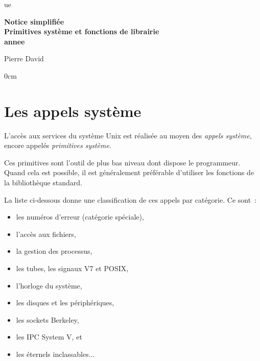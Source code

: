 \documentclass [twoside] {report}
\newcommand {\tassertoc} {{ \setlength {\parskip} {0cm} \tableofcontents }}
\begin{document}
\thispagestyle {empty}

\begin {titlepage}
     {ue}

    \vfill

    \begin {center}
	\huge\bf
	Notice simplifiée \\
	\vspace* {5mm}
	Primitives système et fonctions de librairie \\
	\vspace* {5mm}
	 {annee}
    \end {center}

    \vfill

    \begin {flushright}
	Pierre David
    \end {flushright}
\end {titlepage}

\cleardoublepage
\tassertoc



\cleardoublepage

\chapter {Les appels système}


L'accès aux services du système Unix est réalisée
au moyen des {\it appels système}, encore appelés
{\it primitives système}.

Ces primitives sont l'outil de plus bas niveau
dont dispose le programmeur. Quand cela est
possible, il est généralement préférable d'utiliser
les fonctions de la bibliothèque standard.


La liste ci-dessous donne une classification de
ces appels par catégorie. Ce sont~:

\begin {itemize}
    \item les numéros d'erreur (catégorie spéciale),
    \item l'accès aux fichiers,
    \item la gestion des processus,
    \item les tubes, les signaux V7 et POSIX,
    \item l'horloge du système,
    \item les disques et les périphériques,
    \item les sockets Berkeley,
    \item les IPC System V, et
    \item les éternels inclassables...
\end {itemize}
\end{document}
